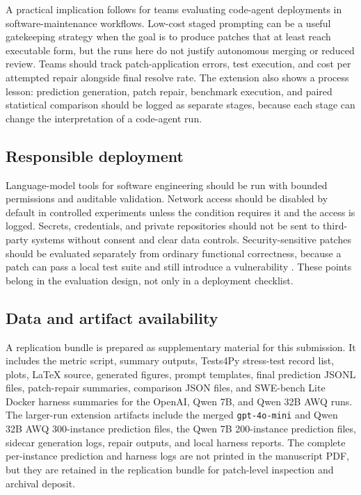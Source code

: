 \documentclass[preprint,12pt]{elsarticle}
\begin{document}
A practical implication follows for teams evaluating code-agent deployments in software-maintenance workflows. Low-cost staged prompting can be a useful gatekeeping strategy when the goal is to produce patches that at least reach executable form, but the runs here do not justify autonomous merging or reduced review. Teams should track patch-application errors, test execution, and cost per attempted repair alongside final resolve rate. The extension also shows a process lesson: prediction generation, patch repair, benchmark execution, and paired statistical comparison should be logged as separate stages, because each stage can change the interpretation of a code-agent run.

\subsection{Responsible deployment}

Language-model tools for software engineering should be run with bounded permissions and auditable validation. Network access should be disabled by default in controlled experiments unless the condition requires it and the access is logged. Secrets, credentials, and private repositories should not be sent to third-party systems without consent and clear data controls. Security-sensitive patches should be evaluated separately from ordinary functional correctness, because a patch can pass a local test suite and still introduce a vulnerability \cite{shen2025secrepobench}. These points belong in the evaluation design, not only in a deployment checklist.

\subsection{Data and artifact availability}

A replication bundle is prepared as supplementary material for this submission. It includes the metric script, summary outputs, Tests4Py stress-test record list, plots, LaTeX source, generated figures, prompt templates, final prediction JSONL files, patch-repair summaries, comparison JSON files, and SWE-bench Lite Docker harness summaries for the OpenAI, Qwen 7B, and Qwen 32B AWQ runs. The larger-run extension artifacts include the merged \texttt{gpt-4o-mini} and Qwen 32B AWQ 300-instance prediction files, the Qwen 7B 200-instance prediction files, sidecar generation logs, repair outputs, and local harness reports. The complete per-instance prediction and harness logs are not printed in the manuscript PDF, but they are retained in the replication bundle for patch-level inspection and archival deposit.
\end{document}
